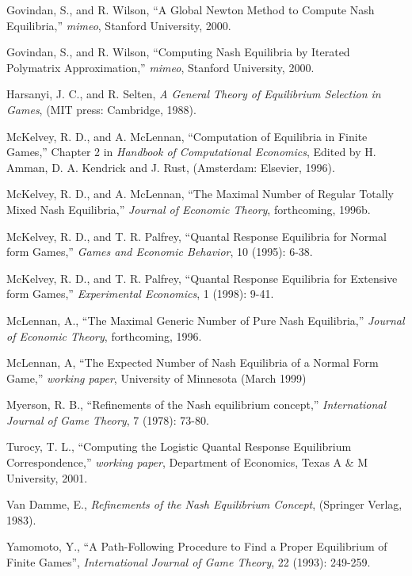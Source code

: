 \documentclass[12pt]{article}
\begin{document}
\begin{description}
\item
Govindan, S., and R. Wilson, ``A Global Newton Method to Compute Nash
Equilibria,'' {\it mimeo}, Stanford University, 2000.  

\item
Govindan, S., and R. Wilson, ``Computing Nash Equilibria by Iterated
Polymatrix Approximation,'' {\it mimeo}, Stanford University, 2000.

\item
Harsanyi, J. C., and R. Selten, {\it A General Theory of Equilibrium
Selection in Games}, (MIT press: Cambridge, 1988).

\item
McKelvey, R. D., and A. McLennan, ``Computation of Equilibria in
Finite Games,'' Chapter 2 in {\it Handbook of Computational
Economics}, Edited by H. Amman, D. A. Kendrick and J. Rust,
(Amsterdam: Elsevier, 1996).

\item
McKelvey, R. D., and A. McLennan, ``The Maximal Number of Regular
Totally Mixed Nash Equilibria,'' {\it Journal of Economic Theory},
forthcoming, 1996b.

\item
McKelvey, R. D., and T. R. Palfrey, ``Quantal Response Equilibria for
Normal form Games,'' {\it Games and Economic Behavior}, 10 (1995):
6-38.

\item
McKelvey, R. D., and T. R. Palfrey, ``Quantal Response Equilibria for
Extensive form Games,'' {\it Experimental Economics}, 1 (1998): 9-41.

\item 
McLennan, A., ``The Maximal Generic Number of Pure Nash Equilibria,''
{\it Journal of Economic Theory}, forthcoming, 1996.

\item
McLennan, A, ``The Expected Number of Nash Equilibria of a
Normal Form Game,'' {\it working paper}, University of Minnesota
(March 1999)

\item
Myerson, R. B., ``Refinements of the Nash equilibrium concept,'' {\it
International Journal of Game Theory}, 7 (1978): 73-80.

\item
Turocy, T. L., ``Computing the Logistic Quantal Response Equilibrium
Correspondence,'' {\it working paper}, Department of Economics, Texas
A \& M University, 2001.

\item
Van Damme, E., {\it Refinements of the Nash Equilibrium Concept},
(Springer Verlag, 1983).

\item
Yamomoto, Y., ``A Path-Following Procedure to Find a Proper
Equilibrium of Finite Games'', {\it International Journal of Game
Theory}, 22 (1993): 249-259.
\end{description}
\end{document}
